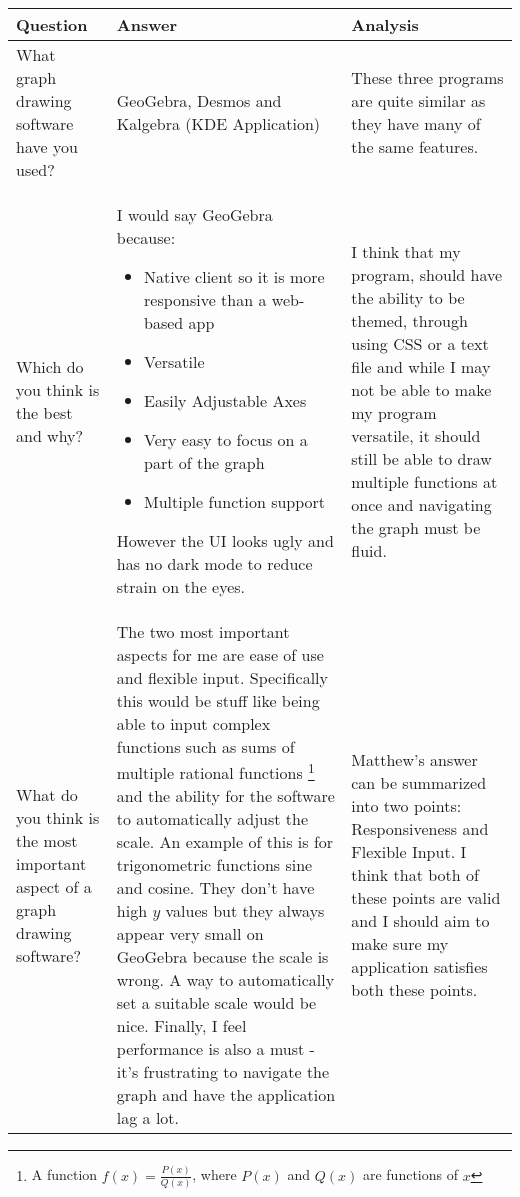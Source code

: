 \documentclass[../../../main.tex]{subfiles}
\begin{document}
\begin{table}[H]
\begin{tabularx}{\textwidth}{@{} Y Y Y @{}} 
\toprule
Question & Answer & Analysis \\
\midrule
What graph drawing software have you used? &  
GeoGebra, Desmos and Kalgebra (KDE Application) & 
These three programs are quite similar as they have many of the same features.
 \\ \addlinespace \midrule
Which do you think is the best and why? & 
I would say GeoGebra because:
\begin{itemize}
\item Native client so it is more responsive than a web-based app
\item Versatile
\item Easily Adjustable Axes
\item Very easy to focus on a part of the graph 
\item Multiple function support
\end{itemize}
However the UI looks ugly and has no dark mode to reduce strain on the eyes.
&
I think that my program, should have the ability to be themed, through using CSS or a text file and while I may not be able to make my program versatile, it should still be able to draw multiple functions at once and navigating the graph must be fluid.
\\ \addlinespace \midrule
What do you think is the most important
aspect of a graph drawing software?
&
The two most important aspects for me are ease of use and flexible input. Specifically this would be stuff like being able to input complex functions such as sums of multiple rational functions
\footnote{A function $f(x) = \frac{P(x)}{Q(x)}$, where $P(x)$ and $Q(x)$ are functions of $x$}
and the ability for the software to automatically adjust the scale. An example of this is for trigonometric functions sine and cosine. They don't have high $y$ values but they always appear very small on GeoGebra because the scale is wrong. A way to automatically set a suitable scale would be nice. Finally, I feel performance is also a must - it's frustrating to navigate the graph and have the application lag a lot.
&
Matthew's answer can be summarized into two points: Responsiveness and Flexible Input. I think that both of these points are valid and I should aim to make sure my application satisfies both these points.\\
\bottomrule
\end{tabularx}
\end{table}
\end{document}
